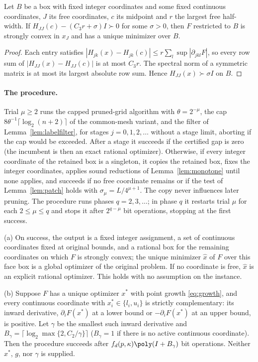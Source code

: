 \begin{lemma}\label{lem:patch}
Let $B$ be a box with fixed integer coordinates and some fixed continuous
coordinates, $J$ its free coordinates, $c$ its midpoint and $r$ the largest
free half-width. If $H_{JJ}(c)-(C_3r+\sigma)I\succ0$ for some
$\sigma>0$, then $F$ restricted to $B$ is strongly convex in $x_J$ and has a
unique minimizer over $B$.
\end{lemma}

\begin{proof}
Each entry satisfies $|H_{jk}(x)-H_{jk}(c)|\le r\sum_l\sup|\partial_{jkl}F|$,
so every row sum of $|H_{JJ}(x)-H_{JJ}(c)|$ is at most $C_3r$. The spectral
norm of a symmetric matrix is at most its largest absolute row sum. Hence
$H_{JJ}(x)\succ\sigma I$ on $B$.
\end{proof}

\paragraph{The procedure.}
Trial $\mu\ge2$ runs the capped pruned-grid algorithm with $\theta=2^{-\mu}$,
the cap $8\theta^{-1}\lceil\log_2(n+2)\rceil$ of the common-mesh variant, and the filter of Lemma~\ref{lem:labelfilter},
for stages $j=0,1,2,\ldots$ without a stage limit, aborting if the cap would be
exceeded. After a stage it succeeds if the certified gap is zero (the
incumbent is then an exact rational optimizer). Otherwise, if every integer
coordinate of the retained box is a singleton, it copies the retained box,
fixes the integer coordinates, applies sound reductions of
Lemma~\ref{lem:monotone} until none applies, and succeeds if no free
coordinate remains or if the test of Lemma~\ref{lem:patch} holds with
$\sigma_\mu=L/4^{\mu+1}$. The copy never influences later pruning. The
procedure runs phases $q=2,3,\ldots$; in phase $q$ it restarts trial $\mu$ for
each $2\le\mu\le q$ and stops it after $2^{q-\mu}$ bit operations, stopping at
the first success.

\begin{theorem}\label{thm:boundary}
(a) On success, the output is a fixed integer assignment, a set of continuous
coordinates fixed at original bounds, and a rational box for the remaining
coordinates on which $F$ is strongly convex; the unique minimizer $\hat x$ of
$F$ over this face box is a global optimizer of the original problem. If no
coordinate is free, $\hat x$ is an explicit rational optimizer. This holds
with no assumption on the instance.

(b) Suppose $F$ has a unique optimizer $x^*$ with point growth
\eqref{eq:growth}, and every continuous coordinate with $x^*_i\in\{l_i,u_i\}$
is strictly complementary: its inward derivative, $\partial_iF(x^*)$ at a
lower bound or $-\partial_iF(x^*)$ at an upper bound, is positive. Let
$\gamma$ be the smallest such inward derivative and
$B_\gamma=\lceil\log_2\max\{2,C_2/\gamma\}\rceil$ ($B_\gamma=1$ if there is
no active continuous coordinate). Then the procedure succeeds after
$f_d(p,\kappa)\poly(I+B_\gamma)$ bit operations. Neither $x^*$, $g$, nor
$\gamma$ is supplied.
\end{theorem}

